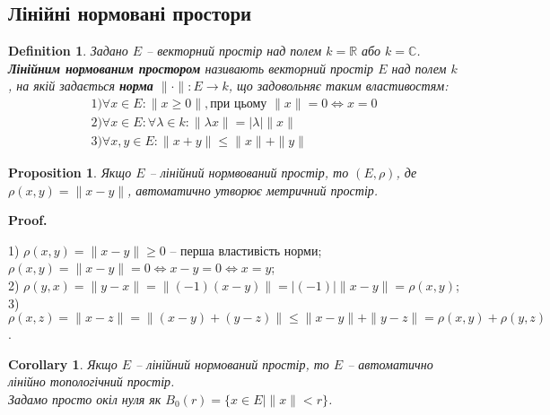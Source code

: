 \documentclass[a4paper, 10pt]{article}
\makeatletter
\theoremstyle{theoremdd}
\newtheorem{definition}[theorem]{Definition}
\newtheorem{proposition}[theorem]{Proposition}
\newtheorem{corollary}[theorem]{Corollary}
\renewenvironment{proof}[1][Proof.\\]{\par
\pushQED{\hfill \qed}%
\normalfont \topsep6\p@\@plus6\p@\relax
\trivlist
\item\relax
{\bfseries
#1\@addpunct{.}}\hspace\labelsep\ignorespaces
}{%
\popQED\endtrivlist\@endpefalse
}
\makeatother
\begin{document}
\subsection{Лінійні нормовані простори}
\begin{definition}
Задано $E$ -- векторний простір над полем $k = \mathbb{R}$ або $k = \mathbb{C}$.\\
\textbf{Лінійним нормованим простором} називають векторний простір $E$ над полем $k$, на якій задається \textbf{норма} $\| \cdot \| \colon E \to k$, що задовольняє таким властивостям:
\begin{align*}
1) \forall x \in E: \| x \geq 0\|, \text{при цьому } \|x\| = 0 \iff x = 0 \\
2) \forall x \in E: \forall \lambda \in k: \| \lambda x\| = |\lambda| \|x\| \\
3) \forall x,y \in E: \|x+y\| \leq \|x\| + \|y\|
\end{align*}
\end{definition}

\begin{proposition}
Якщо $E$ -- лінійний нормвований простір, то $(E, \rho )$, де $\rho(x,y) = \|x-y\|$, автоматично утворює метричний простір.
\end{proposition}

\begin{proof}
1) $\rho(x,y) = \|x - y \| \geq 0$ -- перша властивість норми; $\rho(x,y) = \|x- y\| = 0 \iff x-y = 0 \iff x = y$;\\
2) $\rho(y,x) = \|y-x\| = \| (-1)(x-y) \| = |(-1)| \|x-y\| = \rho(x,y)$;\\
3) $\rho(x,z) = \| x - z\| = \|(x - y) + (y - z)\| \leq \|x-y\| + \|y-z\| = \rho(x,y) + \rho(y,z)$.
\end{proof}

\begin{corollary}
Якщо $E$ -- лінійний нормований простір, то $E$ -- автоматично лінійно топологічний простір.\\
\textit{Задамо просто окіл нуля як $B_0(r) = \{ x \in E \mid \|x\| < r\}$.}
\end{corollary}
\end{document}
